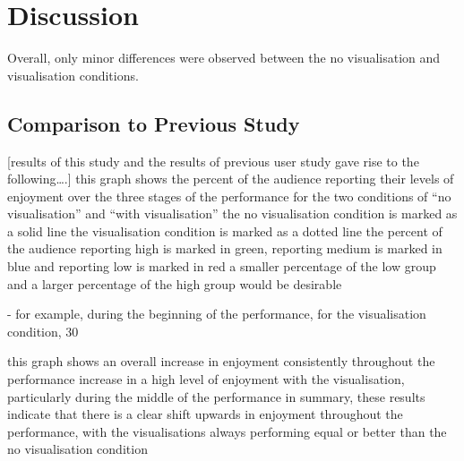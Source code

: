 \more

\section{Discussion}

Overall, only minor differences were observed between the no visualisation and visualisation conditions. 




\subsection{Comparison to Previous Study}


[results of this study and the results of previous user study gave rise to the following….]
this graph shows the percent of the audience reporting their levels of enjoyment over the three stages of the performance for the two conditions of “no visualisation” and “with visualisation” 
the no visualisation condition is marked as a solid line
the visualisation condition is marked as a dotted line
the percent of the audience reporting high is marked in green, reporting medium is marked in blue and reporting low is marked in red
a smaller percentage of the low group and a larger percentage of the high group would be desirable

- for example, during the beginning of the performance, for the visualisation condition, 30%

this graph shows an overall increase in enjoyment consistently throughout the performance
increase in a high level of enjoyment with the visualisation, particularly during the middle of the performance
in summary, these results indicate that there is a clear shift upwards in enjoyment throughout the performance, with the visualisations always performing equal or better than the no visualisation condition


